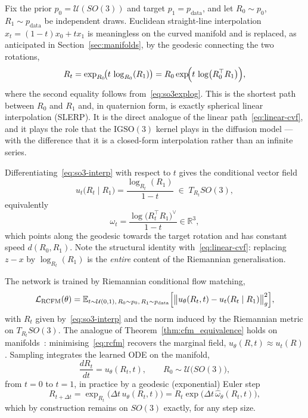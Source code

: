 \documentclass[a4paper,12pt]{article}
\theoremstyle{remark}
\begin{document}
Fix the prior $p_0=\mathcal U(SO(3))$ and target $p_1=p_{\mathrm{data}}$, and let
$R_0\sim p_0$, $R_1\sim p_{\mathrm{data}}$ be independent draws. Euclidean straight-line
interpolation $x_t=(1-t)x_0+tx_1$ is meaningless on the curved manifold and is replaced,
as anticipated in Section~\ref{sec:manifolds}, by the geodesic connecting the two
rotations,
\begin{equation}
\label{eq:so3-interp}
R_t
=
\exp_{R_0}\!\bigl(t\,\log_{R_0}(R_1)\bigr)
=
R_0\exp\!\Bigl(t\,\log\bigl(R_0^\top R_1\bigr)\Bigr),
\end{equation}
where the second equality follows from~\eqref{eq:so3explog}. This is the shortest path
between $R_0$ and $R_1$ and, in quaternion form, is exactly spherical linear
interpolation (SLERP). It is the direct analogue of the linear
path~\eqref{eq:linear-cvf}, and it plays the role that the $\mathrm{IGSO}(3)$ kernel
plays in the diffusion model --- with the difference that it is a closed-form
interpolation rather than an infinite series.

Differentiating~\eqref{eq:so3-interp} with respect to $t$ gives the conditional vector
field
\begin{equation}
\label{eq:so3-cvf}
u_t\bigl(R_t\mid R_1\bigr)
=
\frac{\log_{R_t}(R_1)}{1-t}
\;\in\;T_{R_t}SO(3),
\end{equation}
equivalently
\begin{equation}
\omega_t
=
\frac{\log\!\bigl(R_t^\top R_1\bigr)^\vee}{1-t}\in\mathbb R^3 ,
\end{equation}
which points along the geodesic towards the target rotation and has constant speed
$d(R_0,R_1)$. Note the structural identity with~\eqref{eq:linear-cvf}: replacing
$z-x$ by $\log_{R_t}(R_1)$ is the \emph{entire} content of the Riemannian
generalisation.

The network is trained by Riemannian conditional flow matching,
\begin{equation}
\label{eq:rcfm}
\mathcal L_{\mathrm{RCFM}}(\theta)
=
\mathbb E_{t\sim\mathcal U(0,1),\,R_0\sim p_0,\,R_1\sim p_{\mathrm{data}}}
\Bigl[
\bigl\|
u_\theta(R_t,t)-u_t(R_t\mid R_1)
\bigr\|_g^2
\Bigr],
\end{equation}
with $R_t$ given by~\eqref{eq:so3-interp} and the norm induced by the Riemannian metric
on $T_{R_t}SO(3)$. The analogue of Theorem~\ref{thm:cfm_equivalence} holds on
manifolds~\cite{bortoliRiemannianScoreBasedGenerative2022}: minimising~\eqref{eq:rcfm} recovers the marginal field,
$u_\theta(R,t)\approx u_t(R)$. Sampling integrates the learned ODE on the manifold,
\begin{equation}
\label{eq:so3-ode}
\frac{dR_t}{dt}=u_\theta(R_t,t),
\qquad
R_0\sim\mathcal U\bigl(SO(3)\bigr),
\end{equation}
from $t=0$ to $t=1$, in practice by a geodesic (exponential) Euler step
\[
R_{t+\Delta t}
=
\exp_{R_t}\!\bigl(\Delta t\,u_\theta(R_t,t)\bigr)
=
R_t\exp\!\bigl(\Delta t\,\widehat{\omega}_\theta(R_t,t)\bigr),
\]
which by construction remains on $SO(3)$ exactly, for any step size.
\end{document}
